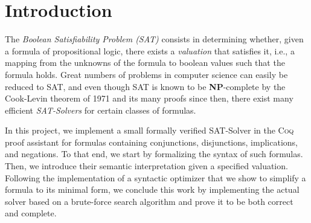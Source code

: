 \section{Introduction}\label{sec:intro}

The \emph{Boolean Satisfiability Problem (SAT)} consists in determining whether, given a formula of propositional logic, there exists a \emph{valuation} that satisfies it, i.e., a mapping from the unknowns of the formula to boolean values such that the formula holds. 
Great numbers of problems in computer science can easily be reduced to SAT, and even though SAT is known to be \textbf{NP}-complete by the Cook-Levin theorem of 1971 \cite{cook1971} and its many proofs since then, there exist many efficient \emph{SAT-Solvers} for certain classes of formulas.

\bigbreak

In this project, we implement a small formally verified SAT-Solver in the \textsc{Coq} proof assistant for formulas containing conjunctions, disjunctions, implications, and negations. 
To that end, we start by formalizing the syntax of such formulas. 
Then, we introduce their semantic interpretation given a specified valuation. 
Following the implementation of a syntactic optimizer that we show to simplify a formula to its minimal form, we conclude this work by implementing the actual solver based on a brute-force search algorithm and prove it to be both correct and complete.